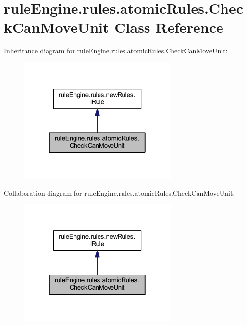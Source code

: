 \hypertarget{classrule_engine_1_1rules_1_1atomic_rules_1_1_check_can_move_unit}{}\section{rule\+Engine.\+rules.\+atomic\+Rules.\+Check\+Can\+Move\+Unit Class Reference}
\label{classrule_engine_1_1rules_1_1atomic_rules_1_1_check_can_move_unit}


Inheritance diagram for rule\+Engine.\+rules.\+atomic\+Rules.\+Check\+Can\+Move\+Unit\+:
\nopagebreak
\begin{figure}[H]
\begin{center}
\leavevmode
\includegraphics[width=226pt]{classrule_engine_1_1rules_1_1atomic_rules_1_1_check_can_move_unit__inherit__graph}
\end{center}
\end{figure}


Collaboration diagram for rule\+Engine.\+rules.\+atomic\+Rules.\+Check\+Can\+Move\+Unit\+:
\nopagebreak
\begin{figure}[H]
\begin{center}
\leavevmode
\includegraphics[width=226pt]{classrule_engine_1_1rules_1_1atomic_rules_1_1_check_can_move_unit__coll__graph}
\end{center}
\end{figure}
